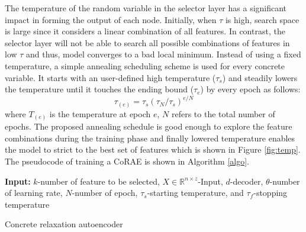 \documentclass{bioinfo}
\newcommand{\R}{\mathbb{R}}
\begin{document}
The temperature of the random variable in the selector layer has a significant impact in forming the output of each node. Initially, when $\tau$ is high, search space is large since it considers a linear combination of all features. In contrast, the selector layer will not be able to search all possible combinations of features in low $\tau$ and thus, model converges to a bad local minimum. Instead of using a fixed temperature, a simple annealing scheduling scheme is used for every concrete variable. It starts with an user-defined high temperature ($\tau_s$) and steadily lowers the temperature until it touches the ending bound ($\tau_e$) by every epoch as follows: 
\begin{equation}
\tau_{(e)} = \tau_s(\tau_N/\tau_s)^{e/N}
\end{equation}
where $T_{(e)}$ is the temperature at epoch $e$, $N$ refers to the total number of epochs. The proposed annealing schedule is good enough to explore the feature combinations during the training phase and finally lowered temperature enables the model to strict to the best set of features which is shown in Figure \ref{fig:temp}. The pseudocode of training a CoRAE is shown in Algorithm \ref{algo}.
\begin{algorithm}[h]
\SetAlgoLined
\textbf{Input:} $k$-number of feature to be selected,  $X \in \R^{n \times z}$-Input, $d$-decoder, $\theta$-number of learning rate, $N$-number of epoch, $\tau_s$-starting temperature, and $\tau_f$-stopping temperature \\
 \caption{Concrete relaxation autoencoder}
 \label{algo}
\end{algorithm}
\end{document}
